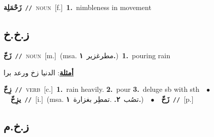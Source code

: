 \documentclass[10pt,a4paper,twoside]{article} %
\begin{document}
\begin{multicols}{2}
{{{{{{{{{{\setlength\topsep{0pt}\textbf{\foreignlanguage{arabic}{زَحْمَلِة}}\ {\color{gray}\texttt{//}\color{black}}\ \textsc{noun}\ [f.]\ \textbf{1.}~nimbleness in movement\ 

\vspace{-3mm}
\subsection*{\color{blue}\foreignlanguage{arabic}{ز.خ.خ}\color{blue}{}} 

{\setlength\topsep{0pt}\textbf{\foreignlanguage{arabic}{زَخّ}}\ {\color{gray}\texttt{//}\color{black}}\ \textsc{noun}\ [m.]\ \color{gray}(msa. \foreignlanguage{arabic}{مطرغزير}~\foreignlanguage{arabic}{\textbf{١.}})\color{black}\ \textbf{1.}~pouring rain\  \begin{flushright}\color{gray}\foreignlanguage{arabic}{\textbf{\underline{\foreignlanguage{arabic}{أمثلة}}}: الدنيا زخ ورعد برا}\end{flushright}\color{black}} \vspace{2mm}

{\setlength\topsep{0pt}\textbf{\foreignlanguage{arabic}{زِخّ}}\ {\color{gray}\texttt{//}\color{black}}\ \textsc{verb}\ [c.]\ \textbf{1.}~rain heavily.  \textbf{2.}~pour  \textbf{3.}~deluge sb with sth\ \ $\bullet$\ \ \setlength\topsep{0pt}\textbf{\foreignlanguage{arabic}{يزِخّ}}\ {\color{gray}\texttt{//}\color{black}}\ [i.]\ \color{gray}(msa. \foreignlanguage{arabic}{تصُب}~\foreignlanguage{arabic}{\textbf{٢.}}  .\foreignlanguage{arabic}{تمطِر بغزارة}~\foreignlanguage{arabic}{\textbf{١.}})\color{black}\ \ $\bullet$\ \ \setlength\topsep{0pt}\textbf{\foreignlanguage{arabic}{زَخّ}}\ {\color{gray}\texttt{//}\color{black}}\ [p.]\ 

\vspace{-3mm}
\subsection*{\color{blue}\foreignlanguage{arabic}{ز.خ.م}\color{blue}{}} 

}}}}}}}}}}}
\end{multicols}
\end{document}
